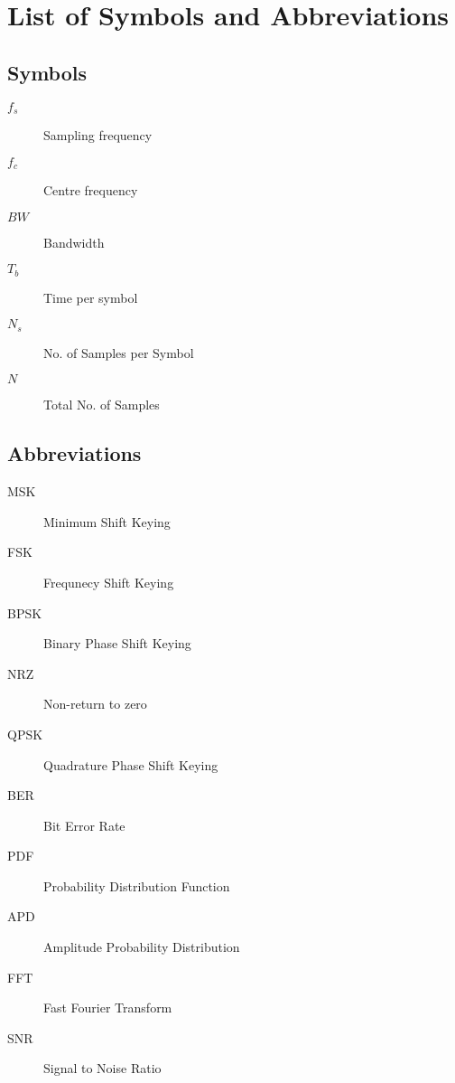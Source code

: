 \section{List of Symbols and Abbreviations} 
\subsection{Symbols}
\begin{small}
\begin{description}
    \item[$f_s$] Sampling frequency
    \item[$f_c$] Centre frequency
    \item[$BW$] Bandwidth
    \item[$T_b$] Time per symbol
    \item[$N_s$] No. of Samples per Symbol
    \item[$N$] Total No. of Samples
\end{description}
\end{small}
\subsection{Abbreviations}

\begin{small}
\begin{description}
    \item[MSK] Minimum Shift Keying
    \item[FSK] Frequnecy Shift Keying
    \item[BPSK] Binary Phase Shift Keying
    \item[NRZ] Non-return to zero
    \item[QPSK] Quadrature Phase Shift Keying
    \item[BER] Bit Error Rate
    \item[PDF] Probability Distribution Function
    \item[APD] Amplitude Probability Distribution
    \item[FFT] Fast Fourier Transform
    \item[SNR] Signal to Noise Ratio
\end{description}
\end{small}

